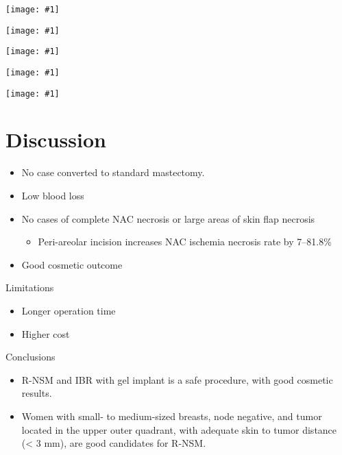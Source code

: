 \documentclass{beamer}
\newcommand*{\solo}[1]{\centering\texttt{[image: \#1]}}
\begin{document}
\begin{frame}
    \solo{T1e.eps}
\end{frame}

\begin{frame}
    \solo{T1f.eps}
\end{frame}

\begin{frame}
    \solo{T2a.eps}
\end{frame}

\begin{frame}
    \solo{T2b.eps}
\end{frame}

\begin{frame}
    \solo{T3.eps}
\end{frame}

\section{Discussion}
\begin{frame}
    \begin{itemize}
        \item No case converted to standard mastectomy.
        \item Low blood loss
        \item No cases of complete NAC necrosis or large areas of skin flap necrosis
            \begin{itemize}
                \item Peri-areolar incision increases NAC ischemia necrosis rate by 7--81.8\%
            \end{itemize}
        \item Good cosmetic outcome
    \end{itemize}
\end{frame}

\begin{frame}{Limitations}
    \begin{itemize}
        \item Longer operation time
        \item Higher cost
    \end{itemize}
\end{frame}

\begin{frame}{Conclusions}
    \begin{itemize}
        \item R-NSM and IBR with gel implant is a safe procedure, with good cosmetic results.
        \item Women with small- to medium-sized breasts, node negative, and
              tumor located in the upper outer quadrant, with adequate skin to
              tumor distance (< 3 mm), are good candidates for R-NSM.
    \end{itemize}
\end{frame}
\end{document}

